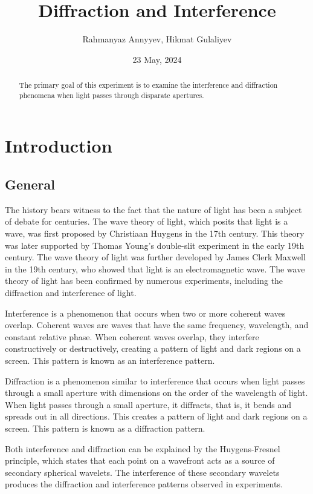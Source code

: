 \documentclass[10pt]{article}
\title{Diffraction and Interference}
\author{Rahmanyaz Annyyev, Hikmat Gulaliyev}
\date{23 May, 2024}
\begin{document}
\maketitle

\begin{abstract}

The primary goal of this experiment is to examine the interference and diffraction phenomena when light passes through disparate apertures.

\end{abstract}

\section{Introduction}

\subsection*{General}

The history bears witness to the fact that the nature of light has been a subject of debate for centuries. The wave theory of light, which posits that light is a wave, was first proposed by Christiaan Huygens in the 17th century. This theory was later supported by Thomas Young's double-slit experiment in the early 19th century. The wave theory of light was further developed by James Clerk Maxwell in the 19th century, who showed that light is an electromagnetic wave. The wave theory of light has been confirmed by numerous experiments, including the diffraction and interference of light.

Interference is a phenomenon that occurs when two or more coherent waves overlap. Coherent waves are waves that have the same frequency, wavelength, and constant relative phase. When coherent waves overlap, they interfere constructively or destructively, creating a pattern of light and dark regions on a screen. This pattern is known as an interference pattern.

Diffraction is a phenomenon similar to interference that occurs when light passes through a small aperture with dimensions on the order of the wavelength of light. When light passes through a small aperture, it diffracts, that is, it bends and spreads out in all directions. This creates a pattern of light and dark regions on a screen. This pattern is known as a diffraction pattern.

Both interference and diffraction can be explained by the Huygens-Fresnel principle, which states that each point on a wavefront acts as a source of secondary spherical wavelets. The interference of these secondary wavelets produces the diffraction and interference patterns observed in experiments.
\end{document}
